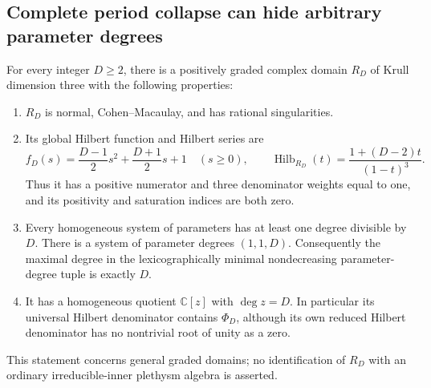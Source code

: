 \subsection{Complete period collapse can hide arbitrary parameter degrees}

\begin{proposition}
\label{prop:toricperiodcollapse}
For every integer $D\ge2$, there is a positively graded complex domain
$R_D$ of Krull dimension three with the following properties:
\begin{enumerate}
\item $R_D$ is normal, Cohen--Macaulay, and has rational singularities.
\item Its global Hilbert function and Hilbert series are
\[
 f_D(s)=\frac{D-1}{2}s^2+\frac{D+1}{2}s+1\quad(s\ge0),
 \qquad
 \operatorname{Hilb}_{R_D}(t)=\frac{1+(D-2)t}{(1-t)^3}.
 \tag{P-F21a}
\]
Thus it has a positive numerator and three denominator weights equal to
one, and its positivity and saturation indices are both zero.
\item Every homogeneous system of parameters has at least one degree
divisible by $D$. There is a system of parameter degrees $(1,1,D)$.
Consequently the maximal degree in the lexicographically minimal
nondecreasing parameter-degree tuple is exactly $D$.
\item It has a homogeneous quotient $\mathbb C[z]$ with $\deg z=D$.
In particular its universal Hilbert denominator contains $\Phi_D$,
although its own reduced Hilbert denominator has no nontrivial root
of unity as a zero.
\end{enumerate}
This statement concerns general graded domains; no identification of
$R_D$ with an ordinary irreducible-inner plethysm algebra is asserted.
\end{proposition}

